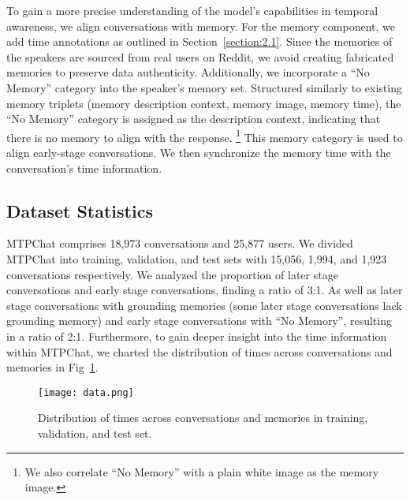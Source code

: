 \vspace{-1mm}
To gain a more precise understanding of the model's capabilities in temporal awareness, we align conversations with memory. For the memory component, we add time annotations as outlined in Section~\ref{section:2.1}. Since the memories of the speakers are sourced from real users on Reddit, we avoid creating fabricated memories to preserve data authenticity. Additionally, we incorporate a ``No Memory'' category into the speaker's memory set. Structured similarly to existing memory triplets (memory description context, memory image, memory time), the ``No Memory'' category is assigned as the description context, indicating that there is no memory to align with the response. \footnote{We also correlate ``No Memory'' with a plain white image as the memory image.} This memory category is used to align early-stage conversations. We then synchronize the memory time with the conversation's time information.

\subsection{Dataset Statistics}


MTPChat comprises 18,973 conversations and 25,877 users. We divided MTPChat into training, validation, and test sets with 15,056, 1,994, and 1,923 conversations respectively. We analyzed the proportion of later stage conversations and early stage conversations, finding a ratio of 3:1. As well as later stage conversations with grounding memories (some later stage conversations lack grounding memory) and early stage conversations with ``No Memory'', resulting in a ratio of 2:1. Furthermore, to gain deeper insight into the time information within MTPChat, we charted the distribution of times across conversations and memories in Fig~\ref{data}.


\begin{figure}[t]
\centering
\texttt{[image: data.png]}
\vspace{-2mm}
\caption{Distribution of times across conversations and memories in training, validation, and test set.
}
\vspace{-2mm}
\label{data}
\end{figure}





